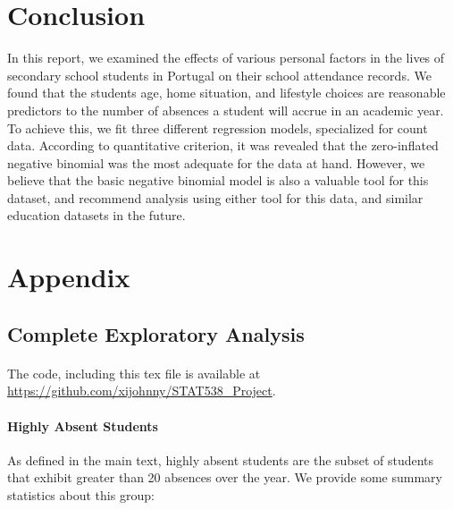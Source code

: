 \documentclass[12pt, titlepage]{article}
\begin{document}
	\section{Conclusion}
	In this report, we examined the effects of various personal factors in the lives of secondary school students in Portugal on their school attendance records. We found that the students age, home situation, and lifestyle choices are reasonable predictors to the number of absences a student will accrue in an academic year. To achieve this, we fit three different regression models, specialized for count data. According to quantitative criterion, it was revealed that the zero-inflated negative binomial was the most adequate for the data at hand. However, we believe that the basic negative binomial model is also a valuable tool for this dataset, and recommend analysis using either tool for this data, and similar education datasets in the future.
	
	
	
	
	\newpage 
	
	\section*{Appendix}
	
	\subsection*{Complete Exploratory Analysis}
	
	\paragraph{} The code, including this tex file is available at \url{https://github.com/xijohnny/STAT538_Project}. 
	\paragraph{Highly Absent Students} As defined in the main text, highly absent students are the subset of students that exhibit greater than 20 absences over the year. We provide some summary statistics about this group:
	
\end{document}
